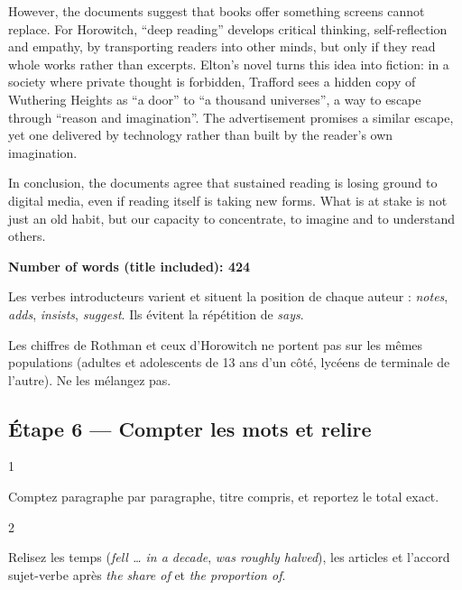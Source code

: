 \documentclass[11pt,a4paper]{article}
\begin{document}
However, the documents suggest that books offer something screens cannot replace. For Horowitch, ``deep reading'' develops critical thinking, self-reflection and empathy, by transporting readers into other minds, but only if they read whole works rather than excerpts. Elton's novel turns this idea into fiction: in a society where private thought is forbidden, Trafford sees a hidden copy of Wuthering Heights as ``a door'' to ``a thousand universes'', a way to escape through ``reason and imagination''. The advertisement promises a similar escape, yet one delivered by technology rather than built by the reader's own imagination.

In conclusion, the documents agree that sustained reading is losing ground to digital media, even if reading itself is taking new forms. What is at stake is not just an old habit, but our capacity to concentrate, to imagine and to understand others.

\textbf{Number of words (title included): 424}

\begin{methode}

Les verbes introducteurs varient et situent la position de chaque auteur : \emph{notes}, \emph{adds}, \emph{insists}, \emph{suggest}. Ils évitent la répétition de \emph{says}.

\end{methode}

\begin{piege}

Les chiffres de Rothman et ceux d'Horowitch ne portent pas sur les mêmes populations (adultes et adolescents de 13 ans d'un côté, lycéens de terminale de l'autre). Ne les mélangez pas.

\end{piege}

\hypertarget{uxe9tape-6-compter-les-mots-et-relire}{%
\subsection{Étape 6 --- Compter les mots et relire}\label{uxe9tape-6-compter-les-mots-et-relire}}

\begin{indication}{1}

Comptez paragraphe par paragraphe, titre compris, et reportez le total exact.

\end{indication}

\begin{indication}{2}

Relisez les temps (\emph{fell \ldots{} in a decade}, \emph{was roughly halved}), les articles et l'accord sujet-verbe après \emph{the share of} et \emph{the proportion of}.

\end{indication}
\end{document}
